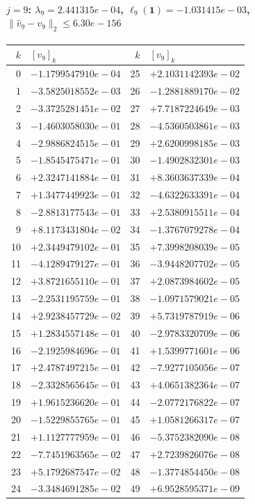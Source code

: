 \documentclass[11pt]{article}
\begin{document}
\paragraph{$j = 9$: $\lambda_{9} = 2.441315e-04$, \quad $\ell_{9}(\mathbf{1}) = -1.031415e-03$, \quad $\|\hat{v}_{9} - v_{9}\|_2 \leq 6.30e-156$}
\begin{center}
{\footnotesize
\begin{tabular}{r@{\;\;}l@{\quad}r@{\;\;}l}
\toprule
$k$ & $[v_{9}]_k$ & $k$ & $[v_{9}]_k$ \\
\midrule
0 & $-1.1799547910e-04$ & 25 & $+2.1031142393e-02$ \\
1 & $-3.5825018552e-03$ & 26 & $-1.2881889170e-02$ \\
2 & $-3.3725281451e-02$ & 27 & $+7.7187224649e-03$ \\
3 & $-1.4603058030e-01$ & 28 & $-4.5360503861e-03$ \\
4 & $-2.9886824515e-01$ & 29 & $+2.6200998185e-03$ \\
5 & $-1.8545475471e-01$ & 30 & $-1.4902832301e-03$ \\
6 & $+2.3247141884e-01$ & 31 & $+8.3603637339e-04$ \\
7 & $+1.3477449923e-01$ & 32 & $-4.6322633391e-04$ \\
8 & $-2.8813177543e-01$ & 33 & $+2.5380915511e-04$ \\
9 & $+8.1173431804e-02$ & 34 & $-1.3767079278e-04$ \\
10 & $+2.3449479102e-01$ & 35 & $+7.3998208039e-05$ \\
11 & $-4.1289479127e-01$ & 36 & $-3.9448207702e-05$ \\
12 & $+3.8721655110e-01$ & 37 & $+2.0873984602e-05$ \\
13 & $-2.2531195759e-01$ & 38 & $-1.0971579021e-05$ \\
14 & $+2.9238457729e-02$ & 39 & $+5.7319787919e-06$ \\
15 & $+1.2834557148e-01$ & 40 & $-2.9783320709e-06$ \\
16 & $-2.1925984696e-01$ & 41 & $+1.5399771601e-06$ \\
17 & $+2.4787497215e-01$ & 42 & $-7.9277105056e-07$ \\
18 & $-2.3328565645e-01$ & 43 & $+4.0651382364e-07$ \\
19 & $+1.9615236620e-01$ & 44 & $-2.0772176822e-07$ \\
20 & $-1.5229855765e-01$ & 45 & $+1.0581266317e-07$ \\
21 & $+1.1127777959e-01$ & 46 & $-5.3752382090e-08$ \\
22 & $-7.7451963565e-02$ & 47 & $+2.7239826076e-08$ \\
23 & $+5.1792687547e-02$ & 48 & $-1.3774854450e-08$ \\
24 & $-3.3484691285e-02$ & 49 & $+6.9528595371e-09$ \\
\bottomrule
\end{tabular}
}
\end{center}
\end{document}

